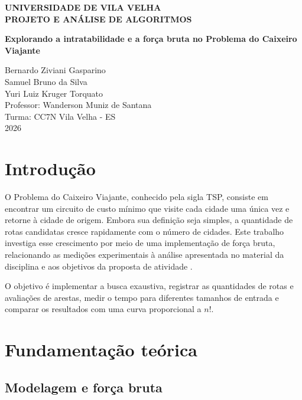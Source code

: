 \documentclass[12pt,a4paper]{article}
\begin{document}
\begin{titlepage}
\begin{center}
    \textbf{UNIVERSIDADE DE VILA VELHA}\\[0.3cm]
    \textbf{PROJETO E ANÁLISE DE ALGORITMOS}\\[4cm]
    {\Large\bfseries Explorando a intratabilidade e a força bruta no Problema do Caixeiro Viajante\par}
    \vspace{3cm}
    Bernardo Ziviani Gasparino\\
    Samuel Bruno da Silva\\
    Yuri Luiz Kruger Torquato\\[0.5cm]
    Professor: Wanderson Muniz de Santana\\[0.5cm]
    Turma: CC7N
    \vfill
    Vila Velha - ES\\
    2026
\end{center}
\end{titlepage}

\tableofcontents
\newpage

\section{Introdução}

O Problema do Caixeiro Viajante, conhecido pela sigla TSP, consiste em encontrar um circuito de custo mínimo que visite cada cidade uma única vez e retorne à cidade de origem. Embora sua definição seja simples, a quantidade de rotas candidatas cresce rapidamente com o número de cidades. Este trabalho investiga esse crescimento por meio de uma implementação de força bruta, relacionando as medições experimentais à análise apresentada no material da disciplina \cite{material} e aos objetivos da proposta de atividade \cite{proposta}.

O objetivo é implementar a busca exaustiva, registrar as quantidades de rotas e avaliações de arestas, medir o tempo para diferentes tamanhos de entrada e comparar os resultados com uma curva proporcional a $n!$.

\section{Fundamentação teórica}

\subsection{Modelagem e força bruta}
\end{document}
